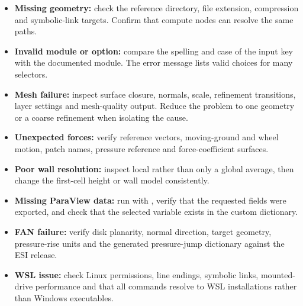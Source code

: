 \begin{itemize}
    \item \textbf{Missing geometry:} check the reference directory, file extension, compression and symbolic-link targets. Confirm that compute nodes can resolve the same paths.
    \item \textbf{Invalid module or option:} compare the spelling and case of the input key with the documented module. The error message lists valid choices for many selectors.
    \item \textbf{Mesh failure:} inspect surface closure, normals, scale, refinement transitions, layer settings and mesh-quality output. Reduce the problem to one geometry or a coarse refinement when isolating the cause.
    \item \textbf{Unexpected forces:} verify reference vectors, moving-ground and wheel motion, patch names, pressure reference and force-coefficient surfaces.
    \item \textbf{Poor wall resolution:} inspect local  rather than only a global average, then change the first-cell height or wall model consistently.
    \item \textbf{Missing ParaView data:} run  with , verify that the requested fields were exported, and check that the selected variable exists in the custom dictionary.
    \item \textbf{FAN failure:} verify disk planarity, normal direction, target geometry, pressure-rise units and the generated pressure-jump dictionary against the ESI release.
    \item \textbf{WSL issue:} check Linux permissions, line endings, symbolic links, mounted-drive performance and that all commands resolve to WSL installations rather than Windows executables.
\end{itemize}
